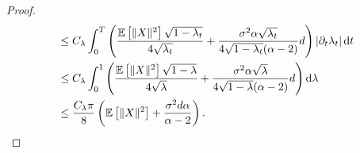 \begin{proof}
\begin{align}
    &\leq C_\lambda \int_0^T \left(\frac{\mathbb{E}\left[\Vert X\Vert^2\right]\sqrt{1-\lambda_t}}{4\sqrt{\lambda_t}} +\frac{\sigma^2\alpha\sqrt{\lambda_t}}{4\sqrt{1-\lambda_t}(\alpha-2)}d\right) \left\vert \partial_t{\lambda_t}\right\vert\mathrm{d} t \nonumber\\ 
    &\leq C_\lambda \int_{0}^{1} \left(\frac{\mathbb{E}\left[\Vert X\Vert^2\right]\sqrt{1-\lambda}}{4\sqrt{\lambda}} + \frac{\sigma^2\alpha\sqrt{\lambda}}{4\sqrt{1-\lambda}(\alpha-2)} d\right) \mathrm{d} \lambda \nonumber\\
    &\leq \frac{C_\lambda\pi}{8} \left(\mathbb{E}\left[\Vert X\Vert^2\right] + \frac{\sigma^2 d\alpha}{\alpha-2}\right).\nonumber
\end{align}
\end{proof}

